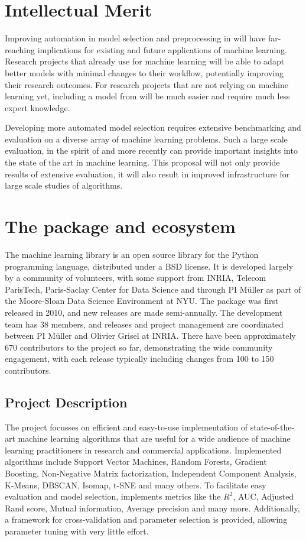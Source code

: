\section{Intellectual Merit}
Improving automation in model selection and preprocessing in \sklearn{} will have far-reaching
implications for existing and future applications of machine learning.
Research projects that already use \sklearn{} for machine learning will be able to adapt better
models with minimal changes to their workflow, potentially improving their research outcomes.
For research projects that are not relying on machine learning yet, including a model
from \sklearn{} will be much easier and require much less expert knowledge.

Developing more automated model selection requires extensive benchmarking and evaluation
on a diverse array of machine learning problems. Such a large scale evaluation,
in the spirit of \textcite{caruana2008empirical, caruana2006empirical} and more
recently \textcite{feurer-nips2015} can provide important insights into the state
of the art in machine learning. This proposal will not only provide results of
extensive evaluation, it will also result in improved infrastructure
for large scale studies of algorithms.

\section{The \sklearn{} package and ecosystem}
The \sklearn{} machine learning library is an open source library for the
Python programming language, distributed under a BSD license.
It is developed largely by a community of volunteers, with some support from
INRIA, Telecom ParisTech, Paris-Saclay Center for Data Science and through PI
M\"uller as part of the Moore-Sloan Data Science Environment at NYU\@.
The package was first released in 2010, and new releases are made semi-annually.
The development team has 38 members, and releases and project management are
coordinated between PI M\"uller and Olivier Grisel at INRIA\@.
There have been approximately 670 contributors to the project so far, demonstrating
the wide community engagement, with each release typically including changes
from 100 to 150 contributors.

\subsection{Project Description}
The \sklearn{} project focusses on efficient and easy-to-use implementation
of state-of-the-art machine learning algorithms that are useful for a wide
audience of machine learning practitioners in research and commercial applications.
Implemented algorithms include Support Vector Machines, Random Forests, Gradient Boosting,
Non-Negative Matrix factorization, Independent Component Analysis, K-Means, DBSCAN, Isomap,
t-SNE and many others. To facilitate easy evaluation and model selection, \sklearn{}
implements metrics like the $R^2$, AUC, Adjusted Rand score, Mutual information, Average precision
and many more. Additionally, a framework for cross-validation and parameter selection is
provided, allowing parameter tuning with very little effort.

